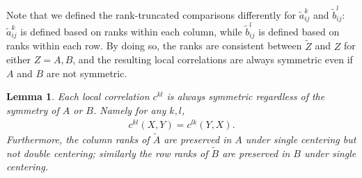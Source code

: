 \documentclass[11pt]{article}
\providecommand{\mt}[1]{\widetilde{#1}}
\newcommand{\G}{c}
\newtheorem{lem}{Lemma}
\begin{document}
Note that we defined the rank-truncated comparisons differently for $\mt{a}_{ij}^k$ and $\mt{b}_{ij}^l$: $\mt{a}_{ij}^k$ is defined based on ranks within each column, while $\mt{b}_{ij}^l$ is defined based on ranks within each row. By doing so, the ranks are consistent between $\tilde{Z}$ and $Z$ for either $Z=A,B$, and the resulting local correlations are always symmetric even if $A$ and $B$ are not symmetric.

\begin{lem}
\label{lem1}
Each local correlation $\G^{kl}$ is always symmetric regardless of the symmetry of $A$ or $B$. Namely for any $k,l$, 
\begin{align*}
\G^{kl}(X,Y)=\G^{lk}(Y,X).
\end{align*}
Furthermore, the column ranks of $\tilde{A}$ are preserved in $A$ under single centering but not double centering; similarly the row ranks of $\tilde{B}$ are preserved in $B$ under single centering.
\end{lem}
\end{document}
